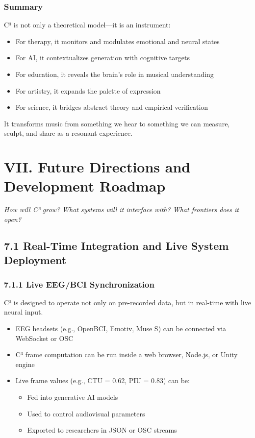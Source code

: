 \documentclass[10pt]{article}
\begin{document}
\subsubsection*{Summary}

C³ is not only a theoretical model—it is an instrument:

\begin{itemize}
    \item For therapy, it monitors and modulates emotional and neural states
    \item For AI, it contextualizes generation with cognitive targets
    \item For education, it reveals the brain’s role in musical understanding
    \item For artistry, it expands the palette of expression
    \item For science, it bridges abstract theory and empirical verification
\end{itemize}

It transforms music from something we hear to something we can measure, sculpt, and share as a resonant experience.

\section*{VII. Future Directions and Development Roadmap}

\textit{How will C³ grow? What systems will it interface with? What frontiers does it open?}

\subsection*{7.1 Real-Time Integration and Live System Deployment}

\subsubsection*{7.1.1 Live EEG/BCI Synchronization}

C³ is designed to operate not only on pre-recorded data, but in real-time with live neural input.

\begin{itemize}
    \item EEG headsets (e.g., OpenBCI, Emotiv, Muse S) can be connected via WebSocket or OSC
    \item C³ frame computation can be run inside a web browser, Node.js, or Unity engine
    \item Live frame values (e.g., CTU = 0.62, PIU = 0.83) can be:
    \begin{itemize}
        \item Fed into generative AI models
        \item Used to control audiovisual parameters
        \item Exported to researchers in JSON or OSC streams
    \end{itemize}
\end{itemize}
\end{document}
